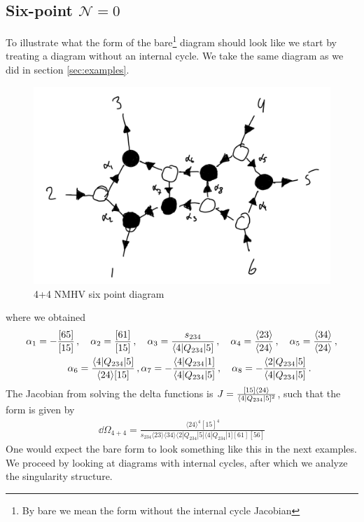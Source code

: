\documentclass[letter,11pt]{article}
\newcommand{\ab}[1]{\langle #1 \rangle}
\newcommand{\sqb}[1]{[ #1 ]}
\newcommand{\aMs}[3]{\langle #1|#2|#3]}  		%
\newcommand{\sab}[1]{s_{#1}}
\newcommand{\twhite}[1]{\textcolor{white}{#1}}
\begin{document}
\subsection{Six-point $\mathcal{N}=0$}
To illustrate what the form of the bare\footnote{By bare we mean the form without the internal cycle Jacobian} diagram should look like we start by treating a diagram without an internal cycle.  We take the same diagram as we did in section \ref{sec:examples}.
\begin{figure}[H]
	\centering
	\includegraphics[width=0.4\linewidth]{6ptYM}
	\caption{4+4 NMHV six point diagram}
	\label{fig:5pt}
\end{figure}
\noindent where we obtained
\begin{align*}
	& \alpha_1 = -\frac{[65]}{[15]}\,, \quad \alpha_2 = \frac{[61]}{[15]}\,, \quad \alpha_3 = \frac{\sab{234}}{\aMs{4}{Q_{234}}{5}}\,, \quad \alpha_4 = \frac{\ab{23}}{\ab{24}}\,, \quad
	\alpha_5 = \frac{\ab{34}}{\ab{24}}\,, \\ 
	& \twhite{.}\hspace{1.4cm} 
	\alpha_6 = \frac{\aMs{4}{Q_{234}}{5}}{\ab{24}\sqb{15}}\,, \alpha_7 = -\frac{\aMs{4}{Q_{234}}{1}}{\aMs{4}{Q_{234}}{5}}\,,\quad
	\alpha_8 = - \frac{\aMs{2}{Q_{234}}{5}}{\aMs{4}{Q_{234}}{5}}\,.
\end{align*}
The Jacobian from solving the delta functions is $		J=\frac{[15]\expval{24}}{\aMs{4}{Q_{234}}{5}^2}$,
such that the form is given by
\begin{equation}
	\begin{aligned}
		\dd\Omega_{4+4}=\frac{\ab{24}^4 \sqb{15}^4}{s_{234}\ab{23}\ab{34}\aMs{2}{Q_{234}}{5}\aMs{4}{Q_{234}}{1}\sqb{61}\sqb{56}}
	\end{aligned}
\end{equation}
One would expect the bare form to look something like this in the next examples. We proceed by looking at diagrams with internal cycles, after which we analyze the singularity structure.
\end{document}
